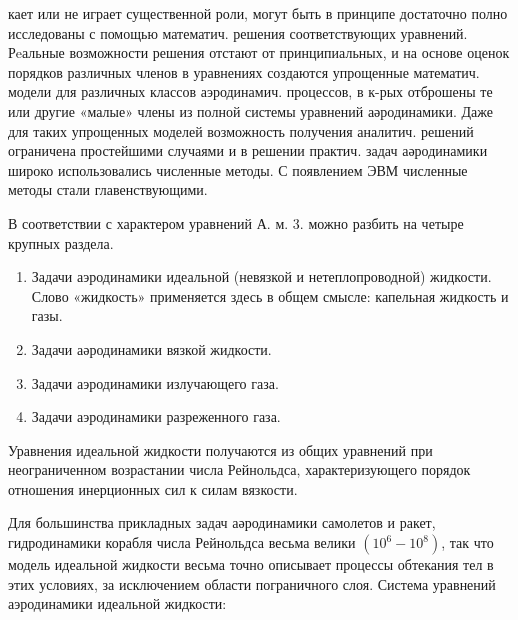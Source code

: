 \documentclass[10pt]{article}
\begin{document}
кает или не играет существенной роли, могут быть в принципе достаточно полно исследованы с помощью математич. решения соответствующих уравнений. Рeальные возможности решения отстают от принципиальных, и на основе оценок порядков различных членов в уравнениях создаются упрощенные математич. модели для различных классов аэродинамич. процессов, в к-рых отброшены те или другие «малые» члены из полной системы уравнений аәродинамики. Даже для таких упрощенных моделей возможность получения аналитич. решений ограничена простейшими случаями и в решении практич. задач аәродинамики широко использовались численные методы. С появлением ЭВМ численные методы стали главенствующими.



В соответствии с характером уравнений А. м. 3. можно разбить на четыре крупных раздела.



\begin{enumerate}

  \item Задачи аэродинамики идеальной (невязкой и нетеплопроводной) жидкости. Слово «жидкость» применяется здесь в общем смысле: капельная жидкость и газы.



  \item Задачи аәродинамики вязкой жидкости.



  \item Задачи аэродинамики излучающего газа.



  \item Задачи аэродинамики разреженного газа.



\end{enumerate}



Уравнения идеальной жидкости получаются из общих уравнений при неограниченном возрастании числа Рейнольдса, характеризующего порядок отношения инерционных сил к силам вязкости.



Для большинства прикладных задач аәродинамики самолетов и ракет, гидродинамики корабля числа Рейнольдса весьма велики $\left(10^{6}-10^{8}\right)$, так что модель идеальной жидкости весьма точно описывает процессы обтекания тел в этих условиях, за исключением области пограничного слоя. Система уравнений аэродинамики идеальной жидкости:
\end{document}
